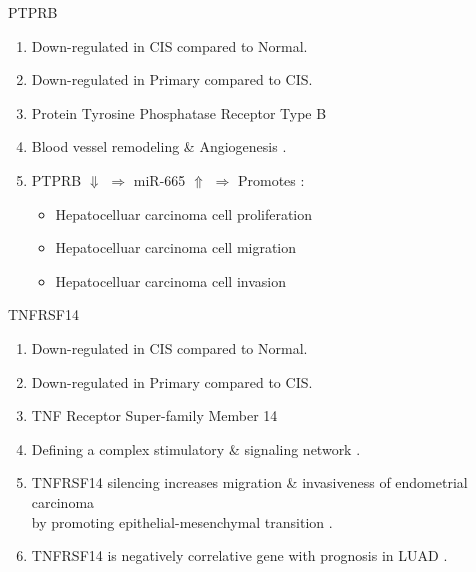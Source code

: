 \documentclass{beamer}
\begin{document}
\begin{frame}[allowframebreaks]
        \begin{block}{PTPRB}
            \begin{enumerate}
                \item Down-regulated in CIS compared to Normal.
                \item Down-regulated in Primary compared to CIS.
                \item Protein Tyrosine Phosphatase Receptor Type B
                \item Blood vessel remodeling \& Angiogenesis \cite{PTPRB-1}.
                \item PTPRB $\Downarrow$ $\Rightarrow$ miR-665 $\Uparrow$ $\Rightarrow$ Promotes \cite{PTPRB-2, PTPRB-3}:
                \begin{itemize}
                    \item Hepatocelluar carcinoma cell proliferation
                    \item Hepatocelluar carcinoma cell migration
                    \item Hepatocelluar carcinoma cell invasion
                \end{itemize}
            \end{enumerate}
        \end{block}

        \begin{block}{TNFRSF14}
            \begin{enumerate}
                \item Down-regulated in CIS compared to Normal.
                \item Down-regulated in Primary compared to CIS.
                \item TNF Receptor Super-family Member 14
                \item Defining a complex stimulatory \& signaling network \cite{TNFRSF14-1}.
                \item TNFRSF14 silencing increases migration \& invasiveness of endometrial carcinoma \\
                    by promoting epithelial-mesenchymal transition \cite{TNFRSF14-2}.
                \item TNFRSF14 is negatively correlative gene with prognosis in LUAD \cite{TNFRSF14-3}.
            \end{enumerate}
        \end{block}


\end{frame}
\end{document}
